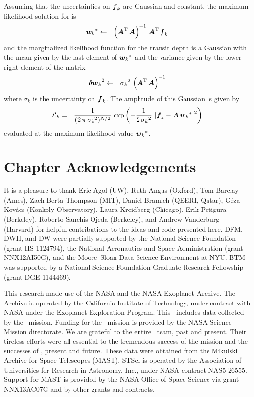 Assuming that the uncertainties on ${\boldsymbol{f}}_k$ are Gaussian and constant,
the maximum likelihood solution for  is
\begin{eqnarray}
{{\ensuremath{\boldsymbol{w}}}_k}^* &\gets& \left( {\boldsymbol{A}}^{\mathrm{T}}\,{\boldsymbol{A}} \right)^{-1}\,
                       {\boldsymbol{A}}^{\mathrm{T}}\,{\boldsymbol{f}}_k
\end{eqnarray}
and the marginalized likelihood function for the transit depth is a Gaussian
with the mean given by the last element of ${{\boldsymbol{w}}_k}^*$ and the variance
given by the lower-right element of the matrix
\begin{eqnarray}
{{\ensuremath{\boldsymbol{\delta w}}}_k}^2 &\gets& {\sigma_k}^2 \,
            \left( {\boldsymbol{A}}^{\mathrm{T}}\,{\boldsymbol{A}} \right)^{-1}
\end{eqnarray}
where $\sigma_k$ is the uncertainty on ${\boldsymbol{f}}_k$.
The amplitude of this Gaussian is given by
\begin{eqnarray}\eqlabel{depth-likelihood}
\mathcal{L}_k &=& \frac{1}{(2\,\pi\,{\sigma_k}^2)^{N/2}}\,\exp\left(
-\frac{1}{2\,{\sigma_k}^2}\,
\left| \bvec{f}_k - \bvec{A}\,{\bvec{w}_k}^* \right|^2
\right)
\end{eqnarray}
evaluated at the maximum likelihood value ${{\boldsymbol{w}}_k}^*$.

\section{Chapter Acknowledgements}

It is a pleasure to thank
Eric Agol (UW),
Ruth Angus (Oxford),
Tom Barclay (Ames),
Zach Berta-Thompson (MIT),
Daniel Bramich (QEERI, Qatar),
G\'eza Kov\'acs (Konkoly Observatory),
Laura Kreidberg (Chicago),
Erik Petigura (Berkeley),
Roberto Sanchis Ojeda (Berkeley),
and
Andrew Vanderburg (Harvard)
for helpful contributions to the ideas and code presented here.
DFM, DWH, and DW were partially supported by the National Science Foundation
(grant IIS-1124794),
the National Aeronautics and Space Administration
(grant NNX12AI50G), and the Moore--Sloan Data Science Environment at NYU.
BTM was supported by a National Science Foundation Graduate Research
Fellowship (grant DGE‐1144469).

This research made use of the NASA  and the
NASA Exoplanet Archive.
The Archive is operated by the California Institute of Technology, under
contract with NASA under the Exoplanet Exploration Program.
This \paper\ includes data collected by the \kepler\ mission. Funding for the
\kepler\ mission is provided by the NASA Science Mission directorate.
We are grateful to the entire \kepler\ team, past and present.
Their tireless efforts were all essential to the tremendous success of the mission
and the successes of \KT, present and future.
These data were obtained from the Mikulski Archive for Space Telescopes
(MAST).
STScI is operated by the Association of Universities for Research in
Astronomy, Inc., under NASA contract NAS5-26555.
Support for MAST is provided by the NASA Office of Space Science via grant
NNX13AC07G and by other grants and contracts.
